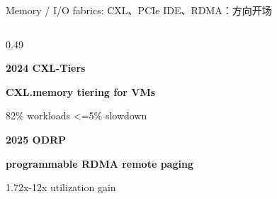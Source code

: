 \begin{frame}[t,shrink=6]{Memory / I/O fabrics: CXL、PCIe IDE、RDMA：方向开场}
\begin{columns}[T,totalwidth=\textwidth]
\begin{column}{0.49\textwidth}
{\begin{minipage}[t]{0.97\linewidth}
\begin{minipage}{0.92\linewidth}
\textcolor{Accent}{\bfseries 2024 CXL-Tiers}\par\textbf{CXL.memory tiering for VMs}\par{\tiny\textcolor{Muted}{82\% workloads <=5\% slowdown}}\par\vspace{1.6mm}
\textcolor{Accent}{\bfseries 2025 ODRP}\par\textbf{programmable RDMA remote paging}\par{\tiny\textcolor{Muted}{1.72x-12x utilization gain}}\par\vspace{1.6mm}
    \end{minipage}
    \vspace{1mm}
  \end{minipage}}
  \end{column}
\end{columns}
\end{frame}


